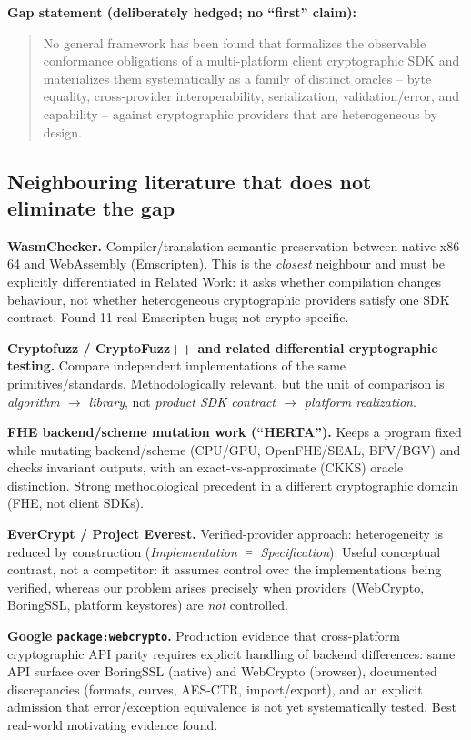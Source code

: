 \documentclass[11pt,a4paper]{article}
\begin{document}
\textbf{Gap statement (deliberately hedged; no ``first'' claim):}
\begin{quote}
No general framework has been found that formalizes the observable conformance obligations of a multi-platform client cryptographic SDK and materializes them systematically as a family of distinct oracles -- byte equality, cross-provider interoperability, serialization, validation/error, and capability -- against cryptographic providers that are heterogeneous by design.
\end{quote}

\subsection{Neighbouring literature that does not eliminate the gap}
\textbf{WasmChecker.} Compiler/translation semantic preservation between native x86-64 and WebAssembly (Emscripten). This is the \emph{closest} neighbour and must be explicitly differentiated in Related Work: it asks whether compilation changes behaviour, not whether heterogeneous cryptographic providers satisfy one SDK contract. Found 11 real Emscripten bugs; not crypto-specific.

\textbf{Cryptofuzz / CryptoFuzz++ and related differential cryptographic testing.} Compare independent implementations of the same primitives/standards. Methodologically relevant, but the unit of comparison is \emph{algorithm $\rightarrow$ library}, not \emph{product SDK contract $\rightarrow$ platform realization}.

\textbf{FHE backend/scheme mutation work (``HERTA'').} Keeps a program fixed while mutating backend/scheme (CPU/GPU, OpenFHE/SEAL, BFV/BGV) and checks invariant outputs, with an exact-vs-approximate (CKKS) oracle distinction. Strong methodological precedent in a different cryptographic domain (FHE, not client SDKs).

\textbf{EverCrypt / Project Everest.} Verified-provider approach: heterogeneity is reduced by construction (\emph{Implementation} $\models$ \emph{Specification}). Useful conceptual contrast, not a competitor: it assumes control over the implementations being verified, whereas our problem arises precisely when providers (WebCrypto, BoringSSL, platform keystores) are \emph{not} controlled.

\textbf{Google \texttt{package:webcrypto}.} Production evidence that cross-platform cryptographic API parity requires explicit handling of backend differences: same API surface over BoringSSL (native) and WebCrypto (browser), documented discrepancies (formats, curves, AES-CTR, import/export), and an explicit admission that error/exception equivalence is not yet systematically tested. Best real-world motivating evidence found.
\end{document}
